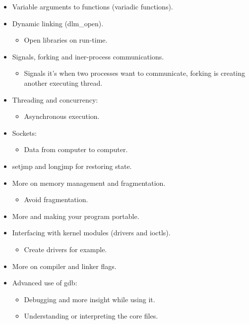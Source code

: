 \begin{itemize}
    \item Variable arguments to functions (variadic functions).
    \item Dynamic linking (dlm\_open).
        \begin{itemize}
            \item Open libraries on run-time.
        \end{itemize}
        
    \item Signals, forking and iner-process communications.
        \begin{itemize}
            \item Signals it's when two processes want to communicate, forking is creating another executing thread.
        \end{itemize}
    
    \item Threading and concurrency:
        \begin{itemize}
            \item Asynchronous execution.
        \end{itemize}
    
    \item Sockets:
        \begin{itemize}
            \item Data from computer to computer.
        \end{itemize}
    
    \item setjmp and longjmp for restoring state.
    \item More on memory management and fragmentation.
        \begin{itemize}
            \item Avoid fragmentation.
        \end{itemize}
    
    \item More and making your program portable. 
    \item Interfacing with kernel modules (drivers and ioctls).
        \begin{itemize}
            \item Create drivers for example.
        \end{itemize}

    \item More on compiler and linker flags.
    \item Advanced use of gdb:
        \begin{itemize}
            \item Debugging and more insight while using it.
            \item Understanding or interpreting the core files.
        \end{itemize}
    

\end{itemize}
